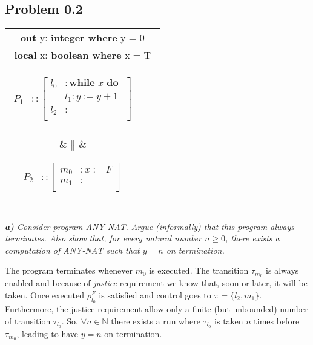 \documentclass[12pt]{article}
\begin{document}
\subsection*{Problem 0.2}
\begin{center}
\begin{tabular}{|ccc|}
\hline
\multicolumn{3}{|c|}{
\textbf{out} y: \textbf{integer where} y = 0
} \\
\multicolumn{3}{|c|}{
\textbf{local} x: \textbf{boolean where} x = T
} \\
\parbox{4cm}{\begin{align*}
      P_1 &:: \left[ \begin{aligned}
 		l_0 &: \textbf{while }x \textbf{ do } \\ 
 			& l_1: y:= y+1\\
 		l_2 &: \\
		\end{aligned} \right]\\
   \end{align*}}
   &
	$\big{\|}$   
   &
   \parbox{4cm}{\begin{align*}
      P_2 &:: \left[ \begin{aligned}
 		m_0 &: x := F \\
 		m_1 &: \\
		\end{aligned} \right]\\
   \end{align*}}\\
    \\\hline
\end{tabular}
\end{center}



\textit{\textbf{a)} Consider program ANY-NAT. Argue (informally) that this program always terminates. Also show that, for every natural number $n \geq 0$,
there exists a computation of ANY-NAT such that $y = n$ on termination.}

\medskip
The program terminates whenever $m_0$ is executed. The transition $\tau_{m_0}$ is always enabled and because of \textit{justice} requirement we know that, soon or later, it will be taken. Once executed $\rho^F_{l_0}$ is satisfied and control goes to $\pi = \{l_2,m_1\}$.
Furthermore, the justice requirement allow only a finite (but unbounded) number of transition $\tau_{l_0}$. So, $\forall n \in \mathbb{N}$ there exists a run where $\tau_{l_0}$ is taken $n$ times before $\tau_{m_0}$, leading to have $y=n$ on termination.
\end{document}
